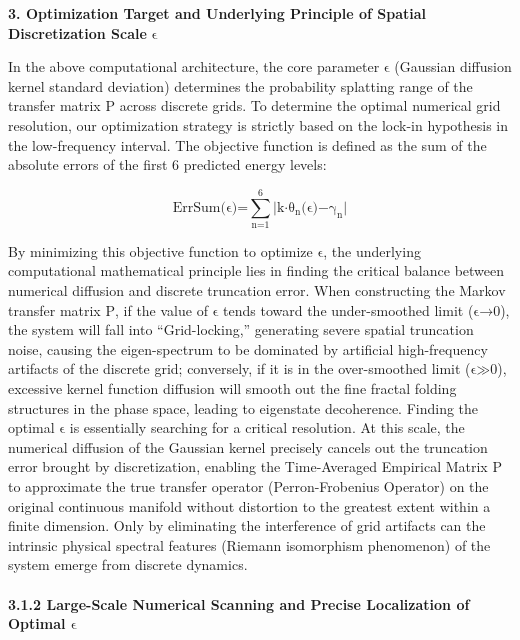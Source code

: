 \textbf{3. Optimization Target and Underlying Principle of Spatial
Discretization Scale} \(\text{ϵ}\)

In the above computational architecture, the core parameter \(\text{ϵ}\)
(Gaussian diffusion kernel standard deviation) determines the
probability splatting range of the transfer matrix \(\text{P}\) across
discrete grids. To determine the optimal numerical grid resolution, our
optimization strategy is strictly based on the lock-in hypothesis in the
low-frequency interval. The objective function is defined as the sum of
the absolute errors of the first 6 predicted energy levels:

\[\text{ErrSum(ϵ)=}\sum_{\text{n}\text{=1}}^{\text{6}}\text{|}\text{k}\text{⋅}\text{θ}_{\text{n}}\text{(ϵ)−}\text{γ}_{\text{n}}\text{|}\]

By minimizing this objective function to optimize \(\text{ϵ}\), the
underlying computational mathematical principle lies in finding the
critical balance between numerical diffusion and discrete truncation
error. When constructing the Markov transfer matrix \(\text{P}\), if the
value of \(\text{ϵ}\) tends toward the under-smoothed limit
(\(\text{ϵ→0}\)), the system will fall into ``Grid-locking,'' generating
severe spatial truncation noise, causing the eigen-spectrum to be
dominated by artificial high-frequency artifacts of the discrete grid;
conversely, if it is in the over-smoothed limit (\(\text{ϵ≫0}\)),
excessive kernel function diffusion will smooth out the fine fractal
folding structures in the phase space, leading to eigenstate
decoherence. Finding the optimal \(\text{ϵ}\) is essentially searching
for a critical resolution. At this scale, the numerical diffusion of the
Gaussian kernel precisely cancels out the truncation error brought by
discretization, enabling the Time-Averaged Empirical Matrix \(\text{P}\)
to approximate the true transfer operator (Perron-Frobenius Operator) on
the original continuous manifold without distortion to the greatest
extent within a finite dimension. Only by eliminating the interference
of grid artifacts can the intrinsic physical spectral features (Riemann
isomorphism phenomenon) of the system emerge from discrete dynamics.

\hypertarget{large-scale-numerical-scanning-and-precise-localization-of-optimal-textux3f5}{%
\paragraph{\texorpdfstring{3.1.2 Large-Scale Numerical Scanning and
Precise Localization of Optimal
\(\text{ϵ}\)}{3.1.2 Large-Scale Numerical Scanning and Precise Localization of Optimal \textbackslash text\{ϵ\}}}\label{large-scale-numerical-scanning-and-precise-localization-of-optimal-textux3f5}}

